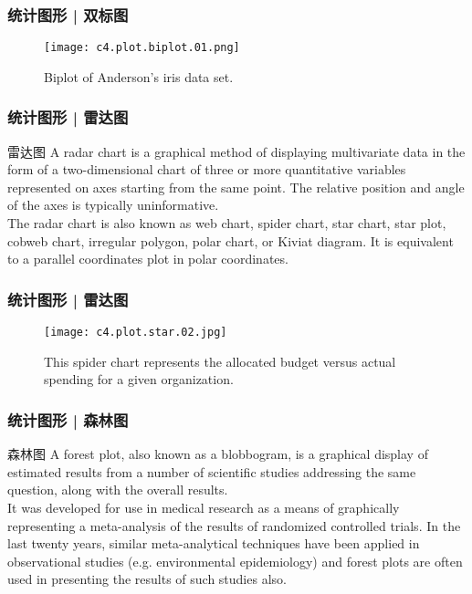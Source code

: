 \begin{frame}
  \frametitle{统计图形 | 双标图}
  \begin{figure}
    \centering
    \texttt{[image: c4.plot.biplot.01.png]}
    \caption{Biplot of Anderson's iris data set.}
  \end{figure}
\end{frame}

\begin{frame}
  \frametitle{统计图形 | 雷达图}
  \begin{block}{雷达图}
    A radar chart is a graphical method of displaying multivariate data in the form of a two-dimensional chart of three or more quantitative variables represented on axes starting from the same point. The relative position and angle of the axes is typically uninformative.\\
    \vspace{0.5em}
The radar chart is also known as web chart, spider chart, star chart, star plot, cobweb chart, irregular polygon, polar chart, or Kiviat diagram. It is equivalent to a parallel coordinates plot in polar coordinates.
  \end{block}
\end{frame}

\begin{frame}
  \frametitle{统计图形 | 雷达图}
  \begin{figure}
    \centering
    \texttt{[image: c4.plot.star.02.jpg]}
    \caption{This spider chart represents the allocated budget versus actual spending for a given organization.}
  \end{figure}
\end{frame}

\begin{frame}
  \frametitle{统计图形 | 森林图}
  \begin{block}{森林图}
    A forest plot, also known as a blobbogram, is a graphical display of estimated results from a number of scientific studies addressing the same question, along with the overall results.\\
    \vspace{0.5em}
It was developed for use in medical research as a means of graphically representing a meta-analysis of the results of randomized controlled trials. In the last twenty years, similar meta-analytical techniques have been applied in observational studies (e.g. environmental epidemiology) and forest plots are often used in presenting the results of such studies also.
  \end{block}
\end{frame}

